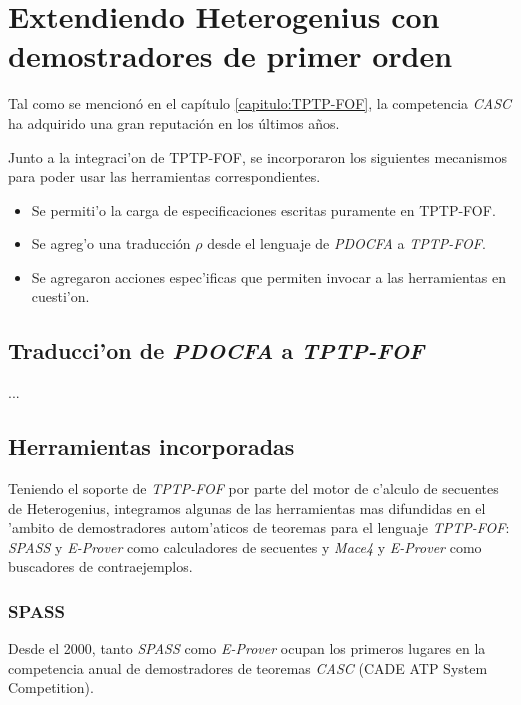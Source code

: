 \section{Extendiendo Heterogenius con demostradores de primer orden}

Tal como se mencionó en el capítulo \ref{capitulo:TPTP-FOF}, la competencia \textit{CASC} ha adquirido una gran reputación en los últimos años.

Junto a la integraci'on de TPTP-FOF, se incorporaron los siguientes mecanismos para poder usar las herramientas correspondientes.

\begin{itemize}
\item Se permiti'o la carga de especificaciones escritas puramente en TPTP-FOF.

\item Se agreg'o una traducción $\rho$ desde el lenguaje de \textit{PDOCFA} a \textit{TPTP-FOF}. 

\item Se agregaron acciones espec'ificas que permiten invocar a las herramientas en cuesti'on.
\end{itemize}

\subsection{Traducci'on de \emph{PDOCFA} a \emph{TPTP-FOF}}

...

\subsection{Herramientas incorporadas}

Teniendo el soporte de \textit{TPTP-FOF} por parte del motor de c'alculo de secuentes de Heterogenius, integramos algunas de las herramientas mas difundidas en el 'ambito de demostradores autom'aticos de teoremas para el lenguaje \textit{TPTP-FOF}: \textit{SPASS} \cite{spass} y \textit{E-Prover} \cite{s13} como calculadores de secuentes y \textit{Mace4} \cite{m05} y \textit{E-Prover} como buscadores de contraejemplos.

\subsubsection{SPASS}

Desde el 2000, tanto \textit{SPASS} como \textit{E-Prover} ocupan los primeros lugares en la competencia anual de demostradores de teoremas \textit{CASC} (CADE ATP System Competition).

